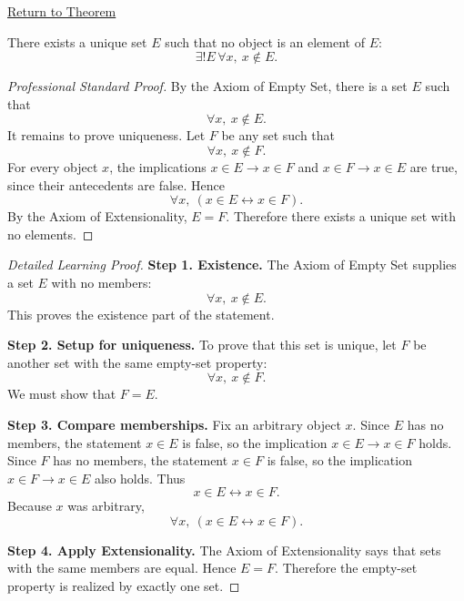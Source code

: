 \newpage
{}
\label{prf:empty-set-exists-unique}

\begin{remark*}[Return]
\hyperref[thm:empty-set-exists-unique]{Return to Theorem}
\end{remark*}


\begin{theorem*}
There exists a unique set $E$ such that no object is an element of $E$:
\[
  \exists! E\,\forall x,\ x\notin E.
\]
\end{theorem*}

\begin{proof}[Professional Standard Proof]
\LRAProofBodyStart
By the Axiom of Empty Set, there is a set $E$ such that
\[
  \forall x,\ x\notin E.
\]
It remains to prove uniqueness. Let $F$ be any set such that
\[
  \forall x,\ x\notin F.
\]
For every object $x$, the implications $x\in E\to x\in F$ and
$x\in F\to x\in E$ are true, since their antecedents are false. Hence
\[
  \forall x,\ (x\in E\leftrightarrow x\in F).
\]
By the Axiom of Extensionality, $E=F$. Therefore there exists a unique set
with no elements.
\end{proof}

\begin{proof}[Detailed Learning Proof]
\LRAProofBodyStart
\textbf{Step 1. Existence.} The Axiom of Empty Set supplies a set $E$ with no
members:
\[
  \forall x,\ x\notin E.
\]
This proves the existence part of the statement.

\textbf{Step 2. Setup for uniqueness.} To prove that this set is unique, let
$F$ be another set with the same empty-set property:
\[
  \forall x,\ x\notin F.
\]
We must show that $F=E$.

\textbf{Step 3. Compare memberships.} Fix an arbitrary object $x$. Since
$E$ has no members, the statement $x\in E$ is false, so the implication
$x\in E\to x\in F$ holds. Since $F$ has no members, the statement $x\in F$ is
false, so the implication $x\in F\to x\in E$ also holds. Thus
\[
  x\in E\leftrightarrow x\in F.
\]
Because $x$ was arbitrary,
\[
  \forall x,\ (x\in E\leftrightarrow x\in F).
\]

\textbf{Step 4. Apply Extensionality.} The Axiom of Extensionality says that
sets with the same members are equal. Hence $E=F$. Therefore the empty-set
property is realized by exactly one set.
\end{proof}

